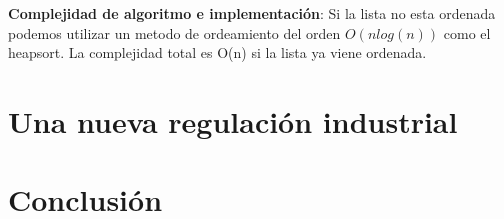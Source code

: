 \documentclass{article}
\begin{document}
\textbf{Complejidad de algoritmo e implementación}: Si la lista no esta ordenada podemos utilizar un metodo de ordeamiento del orden \(O(n log(n))\) como el heapsort. 
La complejidad total es O(n) si la lista ya viene ordenada. 

\section{Una nueva regulación industrial}


\section{Conclusión}
\end{document}
